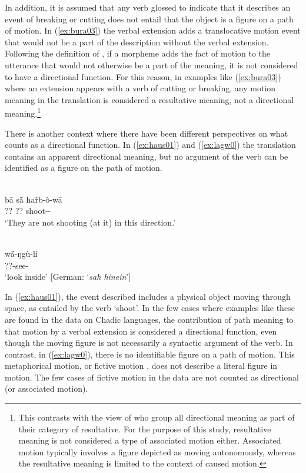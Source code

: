 In addition, it is assumed that any verb glossed to indicate that it describes an event of breaking or cutting does not entail that the object is a figure on a path of motion. In (\ref{ex:bura03}) the verbal extension adds a translocative motion event that would not be a part of the description without the verbal extension. Following the definition of \citet{guillaumeAssociatedMotionSouth2016}, if a morpheme adds the fact of motion to the utterance that would not otherwise be a part of the meaning, it is not considered to have a directional function. For this reason, in examples like (\ref{ex:bura03}) where an extension appears with a verb of cutting or breaking, any motion meaning in the translation is considered a resultative meaning, not a directional meaning.\footnote{This contrasts with the view of \citet{goldbergEnglishResultativeFamily2004} who group all directional meaning as part of their category of resultative. For the purpose of this study, resultative meaning is not considered a type of associated motion either. Associated motion typically involves a figure depicted as moving autonomously, whereas the resultative meaning is limited to the context of caused motion.} 

There is another context where there have been different perspectives on what counts as a directional function. In (\ref{ex:haus01}) and (\ref{ex:lagw0}) the translation contains an apparent directional meaning, but no argument of the verb can be identified as a figure on the path of motion. 
	
	\ea\label{ex:haus01}
	 \\
	\gll bā sā̀ har̃b-ô-wā	\\
	?? ?? shoot--		\\
	\glt `They are not shooting (at it) in this direction.'
	
	\ex\label{ex:lagw0}
	 \\
	\gll wā́-ŋgù-lí	\\
	??-see-\\
	\glt `look inside' [German: `\textit{sah hinein}']
	\z 

In (\ref{ex:haus01}), the event described includes a physical object moving through space, as entailed by the verb `shoot'. In the few cases where examples like these are found in the data on Chadic languages, the contribution of path meaning to that motion by a verbal extension is considered a directional function, even though the moving figure is not necessarily a syntactic argument of the verb. In contrast, in (\ref{ex:lagw0}), there is no identifiable figure on a path of motion. This metaphorical motion, or fictive motion \citep[115]{talmyCognitiveSemantics2000}, does not describe a literal figure in motion. The few cases of fictive motion in the data are not counted as directional (or associated motion).

